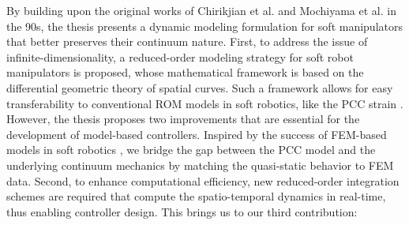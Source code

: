 By building upon the original works of Chirikjian et al. \cite{Chirikjian1992} and Mochiyama et al. \cite{Mochiyama1992} in the 90s, the thesis presents a dynamic modeling formulation for soft manipulators that better preserves their continuum nature. First, to address the issue of infinite-dimensionality, a reduced-order modeling strategy for soft robot manipulators is proposed, whose mathematical framework is based on the differential geometric theory of spatial curves. Such a framework allows for easy transferability to conventional ROM models in soft robotics, like the PCC strain \cite{DellaSantina2020,Katzschmann2019,Falkenhahn2015}. However, the thesis proposes two improvements that are essential for the development of model-based controllers. Inspired by the success of FEM-based models in soft robotics \cite{Duriez2013,Goury2018}, we bridge the gap between the PCC model and the underlying continuum mechanics by matching the quasi-static behavior to FEM data. Second, to enhance computational efficiency, new reduced-order integration schemes are required that compute the spatio-temporal dynamics in real-time, thus enabling controller design. This brings us to our third contribution:


